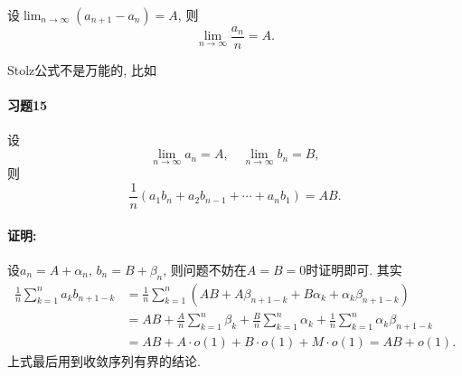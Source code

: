设$\lim_{n\to\infty}(a_{n+1}-a_{n})=A$, 则
$$
\lim_{n\to\infty}\frac{a_{n}}{n}=A.
$$

Stolz公式不是万能的, 比如

\paragraph{习题15}

设
$$
\lim_{n\to\infty}a_{n}=A,\quad\lim_{n\to\infty}b_{n}=B,
$$
则
$$
\frac{1}{n}\left(a_{1}b_{n}+a_{2}b_{n-1}+\cdots+a_{n}b_{1}\right)=AB.
$$


\paragraph{证明:}

设$a_{n}=A+\alpha_{n}$, $b_{n}=B+\beta_{n}$, 则问题不妨在$A=B=0$时证明即可.
其实
\begin{align*}
	\frac{1}{n}\sum_{k=1}^{n}a_{k}b_{n+1-k} & =\frac{1}{n}\sum_{k=1}^{n}\left(AB+A\beta_{n+1-k}+B\alpha_{k}+\alpha_{k}\beta_{n+1-k}\right)\\
	& =AB+\frac{A}{n}\sum_{k=1}^{n}\beta_{k}+\frac{B}{n}\sum_{k=1}^{n}\alpha_{k}+\frac{1}{n}\sum_{k=1}^{n}\alpha_{k}\beta_{n+1-k}\\
	& =AB+A\cdot o(1)+B\cdot o(1)+M\cdot o(1)=AB+o(1).
\end{align*}
上式最后用到收敛序列有界的结论.